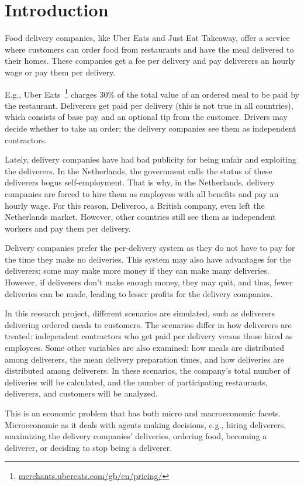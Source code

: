 \section{Introduction}\label{sec:introduction}
Food delivery companies, like Uber Eats and Just Eat Takeaway, offer a service where customers can order food from restaurants and have the meal delivered to their homes.
These companies get a fee per delivery and pay deliverers an hourly wage or pay them per delivery.

E.g., Uber Eats~\footnote{\url{merchants.ubereats.com/gb/en/pricing/}} charges 30\% of the total value of an ordered meal to be paid by the restaurant.
Deliverers get paid per delivery (this is not true in all countries), which consists of base pay and an optional tip from the customer.
Drivers may decide whether to take an order; the delivery companies see them as independent contractors.

Lately, delivery companies have had bad publicity for being unfair and exploiting the deliverers.
In the Netherlands, the government calls the status of these deliverers bogus self-employment.
That is why, in the Netherlands, delivery companies are forced to hire them as employees with all benefits and pay an hourly wage.
For this reason, Deliveroo, a British company, even left the Netherlands market.
However, other countries still see them as independent workers and pay them per delivery.

Delivery companies prefer the per-delivery system as they do not have to pay for the time they make no deliveries.
This system may also have advantages for the deliverers; some may make more money if they can make many deliveries.
However, if deliverers don't make enough money, they may quit, and thus, fewer deliveries can be made, leading to lesser profits for the delivery companies.

In this research project, different scenarios are simulated, such as deliverers delivering ordered meals to customers.
The scenarios differ in how deliverers are treated: independent contractors who get paid per delivery versus
those hired as employees.
Some other variables are also examined: how meals are distributed among deliverers, the mean delivery preparation times, and how deliveries are distributed among deliverers.
In these scenarios, the company's total number of deliveries will be calculated, and the number of participating restaurants, deliverers, and customers will be analyzed.

This is an economic problem that has both micro and macroeconomic facets.
Microeconomic as it deals with agents making decisions, e.g., hiring deliverers, maximizing the delivery companies' deliveries, ordering food, becoming a deliverer, or deciding to stop being a deliverer.

